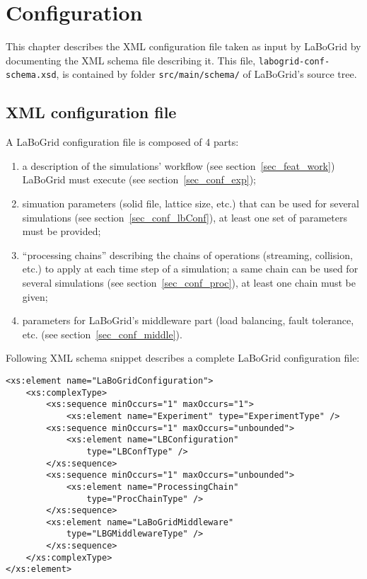 \chapter{Configuration}
\label{sec_conf}

This chapter describes the XML configuration file taken as input by LaBoGrid by
documenting the XML schema file describing it. This file,
\texttt{labogrid-conf-schema.xsd}, is contained by folder
\texttt{src/main/schema/} of LaBoGrid's source tree.

\section{XML configuration file}
\label{sec_conf_xml}

A LaBoGrid configuration file is composed of 4 parts:

\begin{enumerate}
	\item a description of the simulations' workflow (see 
	section~\ref{sec_feat_work}) LaBoGrid must execute (see
	section~\ref{sec_conf_exp});
	\item simuation parameters (solid file, lattice size, etc.) that can be used
	for several simulations (see section~\ref{sec_conf_lbConf}), at least one set
	of parameters must be provided;
	\item ``processing chains'' describing the chains of operations (streaming,
	collision, etc.) to apply at each time step of a simulation; a same chain can
	be used for several simulations (see section~\ref{sec_conf_proc}), at least
	one chain must be given;
	\item parameters for LaBoGrid's middleware part (load balancing, fault
	tolerance, etc. (see section~\ref{sec_conf_middle}).
\end{enumerate}

Following XML schema snippet describes a complete LaBoGrid configuration file:

\begin{Verbatim}[tabsize=2,frame=lines]
<xs:element name="LaBoGridConfiguration">
	<xs:complexType>
		<xs:sequence minOccurs="1" maxOccurs="1">
			<xs:element name="Experiment" type="ExperimentType" />
		<xs:sequence minOccurs="1" maxOccurs="unbounded">
			<xs:element name="LBConfiguration"
				type="LBConfType" />
		</xs:sequence>
		<xs:sequence minOccurs="1" maxOccurs="unbounded">
			<xs:element name="ProcessingChain"
				type="ProcChainType" />
		</xs:sequence>
		<xs:element name="LaBoGridMiddleware"
			type="LBGMiddlewareType" />
		</xs:sequence>
	</xs:complexType>
</xs:element>
\end{Verbatim}


